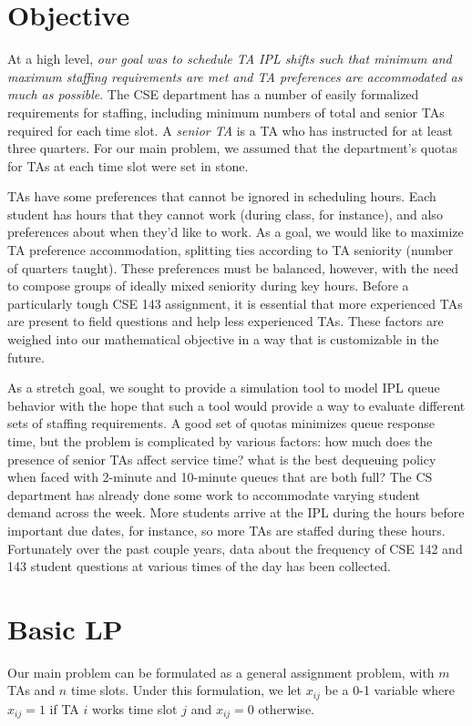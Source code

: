 \documentclass{article}
\begin{document}
\begin{multicols}{2}
\section*{Objective}

At a high level, \textit{our goal was to schedule TA IPL shifts such that minimum and maximum staffing requirements are met and TA preferences are accommodated as much as possible}. The CSE department has a number of easily formalized requirements for staffing, including minimum numbers of total and senior TAs required for each time slot. A \textit{senior TA} is a TA who has instructed for at least three quarters. For our main problem, we assumed that the department's quotas for TAs at each time slot were set in stone.

TAs have some preferences that cannot be ignored in scheduling hours. Each student has hours that they cannot work (during class, for instance), and also preferences about when they'd like to work. As a goal, we would like to maximize TA preference accommodation, splitting ties according to TA seniority (number of quarters taught). These preferences must be balanced, however, with the need to compose groups of ideally mixed seniority during key hours. Before a particularly tough CSE 143 assignment, it is essential that more experienced TAs are present to field questions and help less experienced TAs. These factors are weighed into our mathematical objective in a way that is customizable in the future.

As a stretch goal, we sought to provide a simulation tool to model IPL queue behavior with the hope that such a tool would provide a way to evaluate different sets of staffing requirements. A good set of quotas minimizes queue response time, but the problem is complicated by various factors: how much does the presence of senior TAs affect service time? what is the best dequeuing policy when faced with 2-minute and 10-minute queues that are both full? The CS department has already done some work to accommodate varying student demand across the week. More students arrive at the IPL during the hours before important due dates, for instance, so more TAs are staffed during these hours. Fortunately over the past couple years, data about the frequency of CSE 142 and 143 student questions at various times of the day has been collected.

\section*{Basic LP}
Our main problem can be formulated as a general assignment problem, with $m$ TAs and $n$ time slots. Under this formulation, we let $x_{ij}$ be a 0-1 variable where $x_{ij} = 1$ if TA $i$ works time slot $j$ and $x_{ij} = 0$ otherwise.


\end{multicols}
\end{document}
